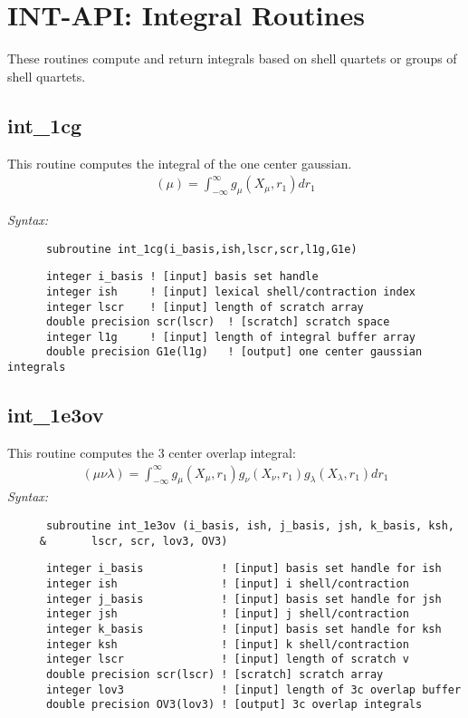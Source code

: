 \section{INT-API: Integral Routines} 
These routines compute and return integrals based on shell quartets 
or groups of shell quartets.   
% 
 
\subsection{int\_1cg} 
This routine computes the integral of the one center gaussian. 
\begin{eqnarray*} 
({\mu}) = \int_{-\infty}^{\infty} g_{\mu}(X_{\mu},r_{1})dr_{1} 
\end{eqnarray*} 
 
{\it Syntax:} 
\begin{verbatim} 
      subroutine int_1cg(i_basis,ish,lscr,scr,l1g,G1e) 
\end{verbatim} 
\begin{verbatim} 
      integer i_basis ! [input] basis set handle 
      integer ish     ! [input] lexical shell/contraction index 
      integer lscr    ! [input] length of scratch array 
      double precision scr(lscr)  ! [scratch] scratch space  
      integer l1g     ! [input] length of integral buffer array 
      double precision G1e(l1g)   ! [output] one center gaussian integrals 
\end{verbatim} 
\subsection{int\_1e3ov} 
This routine computes the 3 center overlap integral: 
\begin{eqnarray*} 
({\mu}{\nu}{\lambda}) = \int_{-\infty}^{\infty} g_{\mu}(X_{\mu},r_{1})g_{\nu}(X_{\nu},r_{1})g_{\lambda}(X_{\lambda},r_{1})dr
_{1} 
\end{eqnarray*} 
{\it Syntax:}  
\begin{verbatim} 
      subroutine int_1e3ov (i_basis, ish, j_basis, jsh, k_basis, ksh, 
     &       lscr, scr, lov3, OV3) 
\end{verbatim} 
\begin{verbatim}  
      integer i_basis            ! [input] basis set handle for ish 
      integer ish                ! [input] i shell/contraction 
      integer j_basis            ! [input] basis set handle for jsh 
      integer jsh                ! [input] j shell/contraction 
      integer k_basis            ! [input] basis set handle for ksh 
      integer ksh                ! [input] k shell/contraction 
      integer lscr               ! [input] length of scratch v 
      double precision scr(lscr) ! [scratch] scratch array 
      integer lov3               ! [input] length of 3c overlap buffer 
      double precision OV3(lov3) ! [output] 3c overlap integrals 
\end{verbatim}  
